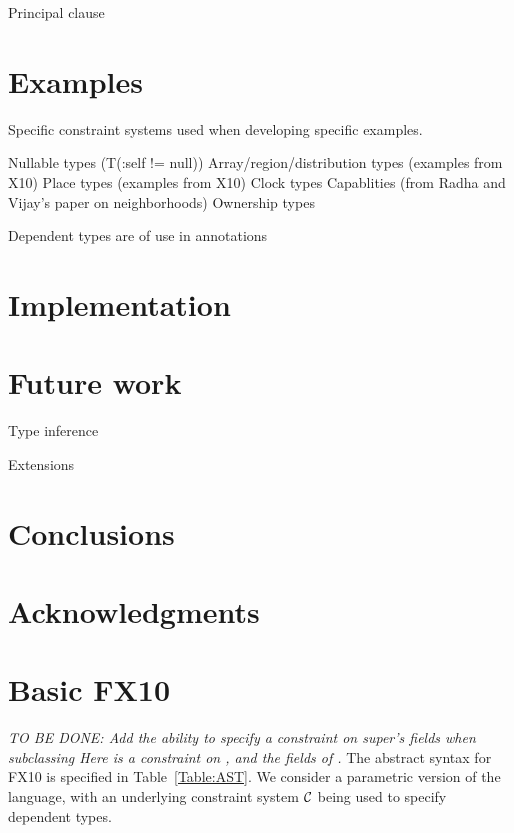 \documentclass[nocopyrightspace,preprint,10pt]{sigplanconf}
\newcommand\FXten{{\sf FX10}}
\begin{document}
Principal clause

\section{Examples}

Specific constraint systems used when developing specific
examples.

Nullable types (T(:self != null))
Array/region/distribution types (examples from X10)
Place types (examples from X10)
Clock types
Capablities (from Radha and Vijay's paper on neighborhoods)
Ownership types

Dependent types are of use in annotations

\section{Implementation}

\section{Future work}

Type inference

Extensions

\section{Conclusions}

\section{Acknowledgments}



\balance
\appendix
\onecolumn

\section{Basic \FXten}
{\em 
TO BE DONE: Add the ability to specify a constraint on super's fields
when subclassing
Here  is a constraint on , and the
fields of .
}
The abstract syntax for \FXten{} is specified in
Table~\ref{Table:AST}. We consider a parametric version of the
language, with an underlying constraint system $\cal C$ \cite{cccc} being used to
specify dependent types. 
\end{document}
